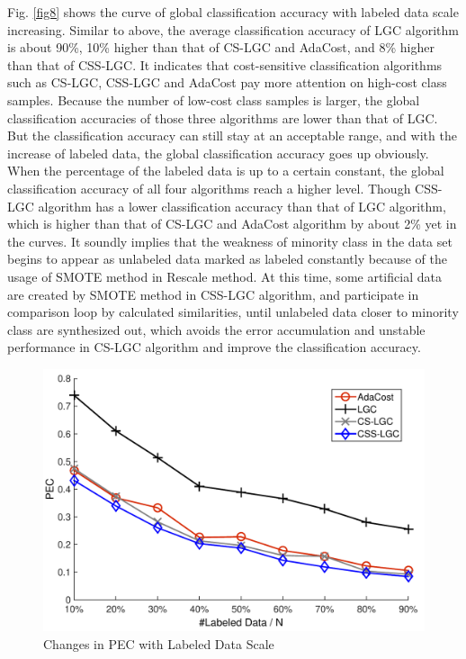 \documentclass{svjour3}                     %
\begin{document}
Fig. \ref{fig8} shows the curve of global classification accuracy with labeled data scale increasing. Similar to above, the average classification accuracy of LGC algorithm is about 90\%, 10\% higher than that of CS-LGC and AdaCost, and 8\% higher than that of CSS-LGC. It indicates that cost-sensitive classification algorithms such as CS-LGC, CSS-LGC and AdaCost pay more attention on high-cost class samples. Because the number of low-cost class samples is larger, the global classification accuracies of those three algorithms are lower than that of LGC. But the classification accuracy can still stay at an acceptable range, and with the increase of labeled data, the global classification accuracy goes up obviously.  When the percentage of the labeled data is up to a certain constant, the global classification accuracy of all four algorithms reach a higher level. Though CSS-LGC algorithm has a lower classification accuracy than that of LGC algorithm, which is higher than that of CS-LGC and  AdaCost algorithm by about 2\% yet in the curves. It soundly implies that the weakness of minority class in the data set begins to appear as unlabeled data marked as labeled constantly because of the usage of SMOTE method in Rescale method. At this time, some artificial data are created by SMOTE method in CSS-LGC algorithm, and participate in comparison loop by calculated similarities, until unlabeled data closer to minority class are synthesized out, which avoids the error accumulation and unstable performance in CS-LGC algorithm and improve the classification accuracy.%

\begin{figure}[ht]
\includegraphics[width=\textwidth]{plot/fig9.pdf}
\caption{Changes in PEC with Labeled Data Scale} \label{fig9}
\end{figure}
\end{document}
